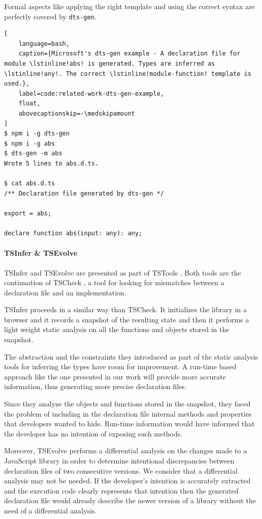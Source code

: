 \documentclass[a4paper,english,cleveref, autoref]{lipics-v2019}
\begin{document}
Formal aspects like applying the right template and using the correct syntax are perfectly covered by \texttt{dts-gen}.

\begin{lstlisting}[
    language=bash,
    caption={Microsoft's dts-gen example - A declaration file for module \lstinline!abs! is generated. Types are inferred as \lstinline!any!. The correct \lstinline!module-function! template is used.},
	label=code:related-work-dts-gen-example,
    float,
    abovecaptionskip=-\medskipamount
]
$ npm i -g dts-gen
$ npm i -g abs
$ dts-gen -m abs
Wrote 5 lines to abs.d.ts.

$ cat abs.d.ts
/** Declaration file generated by dts-gen */

export = abs;

declare function abs(input: any): any;
\end{lstlisting}

\paragraph*{TSInfer \& TSEvolve}
TSInfer and TSEvolve are presented as part of TSTools \cite{DBLP:conf/fase/KristensenM17}. Both tools are the continuation of TSCheck \cite{DBLP:conf/oopsla/FeldthausM14}, a tool for looking for mismatches between a declaration file and an implementation.

TSInfer proceeds in a similar way than TSCheck. It initializes the library in a browser and it records a snapshot of the resulting state and then it performs a light weight static analysis on all the functions and objects stored in the snapshot.

The abstraction and the constraints they introduced as part of the static analysis tools for inferring the types have room for improvement. A run-time based approach like the one presented in our work will provide more accurate information, thus generating more precise declaration files.

Since they analyze the objects and functions stored in the snapshot, they faced the problem of including in the declaration file internal methods and properties that developers wanted to hide. Run-time information would have informed that the developer has no intention of exposing such methods.

Moreover, TSEvolve performs a differential analysis on the changes made to a JavaScript library in order to determine intentional discrepancies between declaration files of two consecutive versions. We consider that a differential analysis may not be needed. If the developer's intention is accurately extracted and the execution code clearly represents that intention then the generated declaration file would already describe the newer version of a library without the need of a differential analysis.
\end{document}
